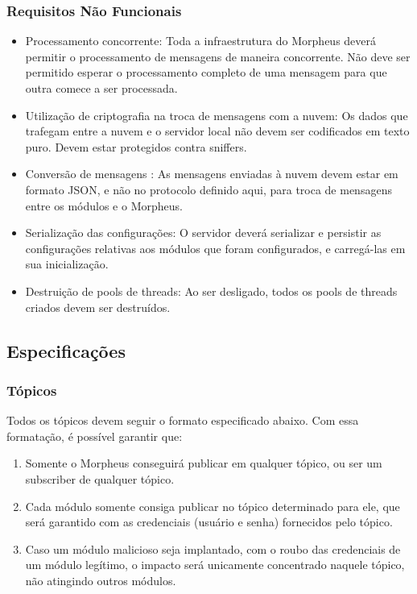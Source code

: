 \subsubsection{Requisitos Não Funcionais}
\begin{itemize}
\item Processamento concorrente: Toda a infraestrutura do Morpheus deverá permitir o processamento de mensagens de maneira concorrente. Não deve ser permitido esperar o processamento completo de uma mensagem para que outra comece a ser processada.
\item Utilização de criptografia na troca de mensagens com a nuvem: Os dados que trafegam entre a nuvem e o servidor local não devem ser codificados em texto puro. Devem estar protegidos contra sniffers.
\item Conversão de mensagens : As mensagens enviadas à nuvem devem estar em formato JSON, e não no protocolo definido aqui, para troca de mensagens entre os módulos e o Morpheus.
\item Serialização das configurações: O servidor deverá serializar e persistir as configurações relativas aos módulos que foram configurados, e carregá-las em sua inicialização.
\item Destruição de pools de threads: Ao ser desligado, todos os pools de threads criados devem ser destruídos.
\end{itemize}

\subsection{Especificações}

\subsubsection{Tópicos}
Todos os tópicos devem seguir o formato especificado abaixo. Com essa formatação, é possível garantir que:

\begin{enumerate}
\item Somente o Morpheus conseguirá publicar em qualquer tópico, ou ser um subscriber de qualquer tópico.
\item Cada módulo somente consiga publicar no tópico determinado para ele, que será garantido com as credenciais (usuário e senha) fornecidos pelo tópico.
\item Caso um módulo malicioso seja implantado, com o roubo das credenciais de um módulo legítimo, o impacto será unicamente concentrado naquele tópico, não atingindo outros módulos.
\end{enumerate}

